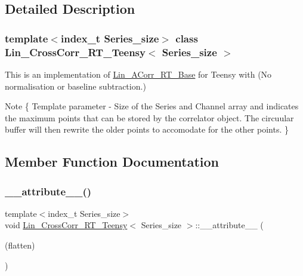 \subsection{Detailed Description}
\subsubsection*{template$<$index\+\_\+t Series\+\_\+size$>$\newline
class Lin\+\_\+\+Cross\+Corr\+\_\+\+R\+T\+\_\+\+Teensy$<$ Series\+\_\+size $>$}

This is an implementation of \hyperlink{classLin__ACorr__RT__Base}{Lin\+\_\+\+A\+Corr\+\_\+\+R\+T\+\_\+\+Base} for Teensy with {\bfseries }(No normalisation or baseline subtraction.) 

\begin{DoxyNote}{Note}
\{ Template parameter -\/ Size of the Series and Channel array and indicates the maximum points that can be stored by the correlator object. The circuular buffer will then rewrite the older points to accomodate for the other points. \} 
\end{DoxyNote}


\subsection{Member Function Documentation}
\mbox{\label{classLin__CrossCorr__RT__Teensy_a33f639fa3a6f025d5a9ebe60b969cc55}} 
\subsubsection{\texorpdfstring{\+\_\+\+\_\+attribute\+\_\+\+\_\+()}{\_\_attribute\_\_()}\hspace{0.1cm}{\footnotesize\ttfamily [1/2]}}
{\footnotesize\ttfamily template$<$index\+\_\+t Series\+\_\+size$>$ \\
void \hyperlink{classLin__CrossCorr__RT__Teensy}{Lin\+\_\+\+Cross\+Corr\+\_\+\+R\+T\+\_\+\+Teensy}$<$ Series\+\_\+size $>$\+::\+\_\+\+\_\+attribute\+\_\+\+\_\+ (\begin{DoxyParamCaption}\item[{(flatten)}]{ }\end{DoxyParamCaption})}



